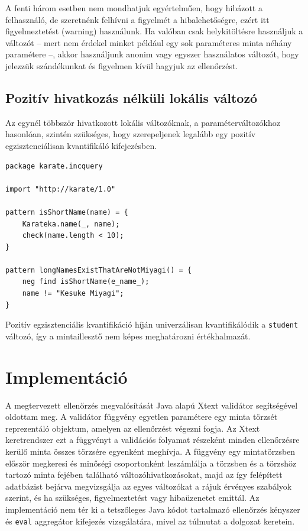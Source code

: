 A fenti három esetben nem mondhatjuk egyértelműen, hogy hibázott a felhasználó, de szeretnénk felhívni a figyelmét a hibalehetőségre, ezért itt figyelmeztetést (warning) használunk.
Ha valóban csak helykitöltésre használjuk a változót -- mert nem érdekel minket például egy sok paraméteres minta néhány paramétere --, akkor használjunk anonim vagy egyszer használatos változót, hogy jelezzük szándékunkat és figyelmen kívül hagyjuk az ellenőrzést.

\subsection{Pozitív hivatkozás nélküli lokális változó}

Az egynél többször hivatkozott lokális változóknak, a paraméterváltozókhoz hasonlóan, szintén szükséges, hogy szerepeljenek legalább egy pozitív egzisztenciálisan kvantifikáló kifejezésben.
%
\begin{lstlisting}
package karate.incquery

import "http://karate/1.0"

pattern isShortName(name) = {
    Karateka.name(_, name);
    check(name.length < 10);
}

pattern longNamesExistThatAreNotMiyagi() = {
    neg find isShortName(e_name_);
    name != "Kesuke Miyagi";
}
\end{lstlisting}
%
Pozitív egzisztenciális kvantifikáció híján univerzálisan kvantifikálódik a \texttt{student} változó, így a mintaillesztő nem képes meghatározni értékhalmazát.


\section{Implementáció}

A megtervezett ellenőrzés megvalósítását Java alapú Xtext validátor segítségével oldottam meg.
A validátor függvény egyetlen paramétere egy minta törzsét reprezentáló objektum, amelyen az ellenőrzést végezni fogja.
Az Xtext keretrendszer ezt a függvényt a validációs folyamat részeként minden ellenőrzésre kerülő minta összes törzsére egyenként meghívja.
A függvény egy mintatörzsben először megkeresi és minőségi csoportonként leszámlálja a törzsben és a törzshöz tartozó minta fejében található változóhivatkozásokat, majd az így felépített adatbázist bejárva megvizsgálja az egyes változókat a rájuk érvényes szabályok szerint, és ha szükséges, figyelmeztetést vagy hibaüzenetet emittál.
Az implementáció nem tér ki a tetszőleges Java kódot tartalmazó ellenőrzés kényszer és \texttt{eval} aggregátor kifejezés vizsgálatára, mivel az túlmutat a dolgozat keretein.

